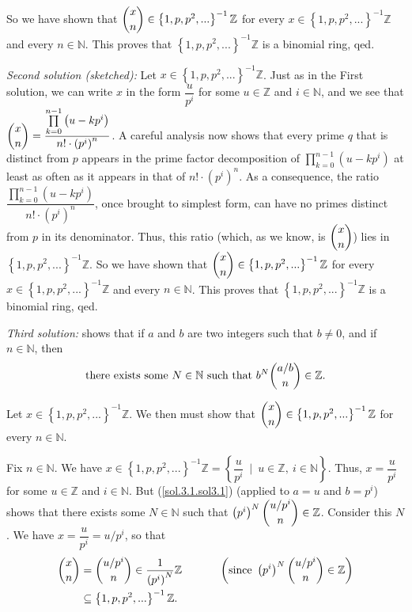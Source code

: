 \documentclass[numbers=enddot,12pt,final,onecolumn,notitlepage]{scrartcl}%
\begin{document}
So we have shown that $\dbinom{x}{n}\in\left\{  1,p,p^{2},...\right\}
^{-1}\mathbb{Z}$ for every $x\in\left\{  1,p,p^{2},...\right\}  ^{-1}%
\mathbb{Z}$ and every $n\in\mathbb{N}$. This proves that $\left\{
1,p,p^{2},...\right\}  ^{-1}\mathbb{Z}$ is a binomial ring, qed.

\textit{Second solution (sketched):} Let $x\in\left\{  1,p,p^{2},...\right\}
^{-1}\mathbb{Z}$. Just as in the First solution, we can write $x$ in the form
$\dfrac{u}{p^{i}}$ for some $u\in\mathbb{Z}$ and $i\in\mathbb{N}$, and we see
that $\dbinom{x}{n}=\dfrac{\prod\limits_{k=0}^{n-1}\left(  u-kp^{i}\right)
}{n!\cdot\left(  p^{i}\right)  ^{n}}$. A careful analysis now shows that every
prime $q$ that is distinct from $p$ appears in the prime factor decomposition
of $\prod\limits_{k=0}^{n-1}\left(  u-kp^{i}\right)  $ at least as often as it
appears in that of $n!\cdot\left(  p^{i}\right)  ^{n}$. As a consequence, the
ratio $\dfrac{\prod\limits_{k=0}^{n-1}\left(  u-kp^{i}\right)  }%
{n!\cdot\left(  p^{i}\right)  ^{n}}$, once brought to simplest form, can have
no primes distinct from $p$ in its denominator. Thus, this ratio (which, as we
know, is $\dbinom{x}{n}$) lies in $\left\{  1,p,p^{2},...\right\}
^{-1}\mathbb{Z}$. So we have shown that $\dbinom{x}{n}\in\left\{
1,p,p^{2},...\right\}  ^{-1}\mathbb{Z}$ for every $x\in\left\{  1,p,p^{2}%
,...\right\}  ^{-1}\mathbb{Z}$ and every $n\in\mathbb{N}$. This proves that
$\left\{  1,p,p^{2},...\right\}  ^{-1}\mathbb{Z}$ is a binomial ring, qed.

\textit{Third solution:} \cite[Additional exercise 7]{Grin-detn} shows that if
$a$ and $b$ are two integers such that $b\neq0$, and if $n\in\mathbb{N}$,
then
\begin{equation}
\text{there exists some }N\in\mathbb{N}\text{ such that }b^{N}\dbinom{a/b}%
{n}\in\mathbb{Z}. \label{sol.3.1.sol3.1}%
\end{equation}


Let $x\in\left\{  1,p,p^{2},...\right\}  ^{-1}\mathbb{Z}$. We then must show
that $\dbinom{x}{n}\in\left\{  1,p,p^{2},...\right\}  ^{-1}\mathbb{Z}$ for
every $n\in\mathbb{N}$.

Fix $n\in\mathbb{N}$. We have $x\in\left\{  1,p,p^{2},...\right\}
^{-1}\mathbb{Z}=\left\{  \dfrac{u}{p^{i}}\ \mid\ u\in\mathbb{Z},\ i\in
\mathbb{N}\right\}  $. Thus, $x=\dfrac{u}{p^{i}}$ for some $u\in\mathbb{Z}$
and $i\in\mathbb{N}$. But (\ref{sol.3.1.sol3.1}) (applied to $a=u$ and
$b=p^{i}$) shows that there exists some $N\in\mathbb{N}$ such that $\left(
p^{i}\right)  ^{N}\dbinom{u/p^{i}}{n}\in\mathbb{Z}$. Consider this $N$. We
have $x=\dfrac{u}{p^{i}}=u/p^{i}$, so that
\begin{align*}
\dbinom{x}{n}  &  =\dbinom{u/p^{i}}{n}\in\dfrac{1}{\left(  p^{i}\right)  ^{N}%
}\mathbb{Z}\ \ \ \ \ \ \ \ \ \ \left(  \text{since }\left(  p^{i}\right)
^{N}\dbinom{u/p^{i}}{n}\in\mathbb{Z}\right) \\
&  \subseteq\left\{  1,p,p^{2},...\right\}  ^{-1}\mathbb{Z}.
\end{align*}
\end{document}
